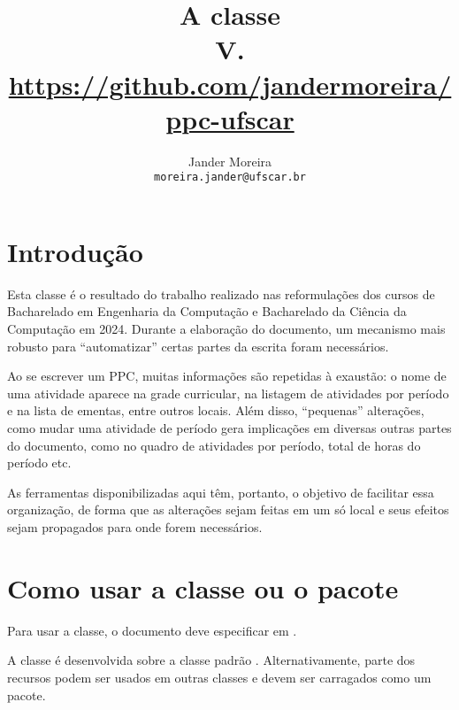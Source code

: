 \documentclass[a4paper, 11pt]{article}
\title{
    A classe \PackageName{ppc-ufscar}\\
    \small V.\PPCVersion\\
    \url{https://github.com/jandermoreira/ppc-ufscar}
}
\author{Jander Moreira\\\footnotesize\texttt{moreira.jander@ufscar.br}}
\date{}
\begin{document}
\maketitle

\hypersetup{urlcolor = blue!70!black}



\section{Introdução}
Esta classe é o resultado do trabalho realizado nas reformulações dos cursos de Bacharelado em Engenharia da Computação e Bacharelado da Ciência da Computação em 2024. Durante a elaboração do documento, um mecanismo mais robusto para ``automatizar'' certas partes da escrita foram necessários.

Ao se escrever um PPC, muitas informações são repetidas à exaustão: o nome de uma atividade aparece na grade curricular, na listagem de atividades por período e na lista de ementas, entre outros locais. Além disso, ``pequenas'' alterações, como mudar uma atividade de período gera implicações em diversas outras partes do documento, como no quadro de atividades por período, total de horas do período etc.

As ferramentas disponibilizadas aqui têm, portanto, o objetivo de facilitar essa organização, de forma que as alterações sejam feitas em um só local e seus efeitos sejam propagados para onde forem necessários.


\section{Como usar a classe ou o pacote}
Para usar a classe, o documento deve especificar  em .


A classe é desenvolvida sobre a classe padrão . Alternativamente, parte dos recursos podem ser usados em outras classes e devem ser carragados como um pacote.

\end{document}
